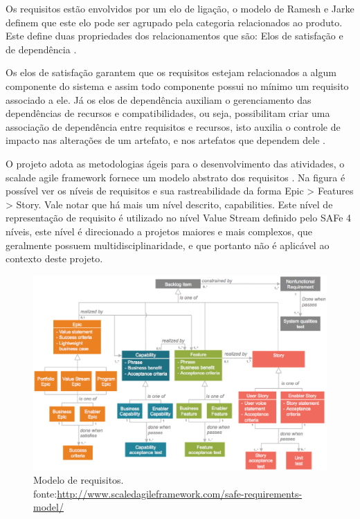 Os requisitos estão envolvidos por um elo de ligação, o modelo de Ramesh e Jarke definem que este elo pode ser agrupado pela categoria relacionados ao produto. Este define duas propriedades dos relacionamentos que são: Elos de satisfação e de dependência \cite{leite2005}.

Os elos de satisfação garantem que os requisitos estejam relacionados a algum componente do sistema e assim todo componente possui no mínimo um requisito associado a ele. Já os elos de dependência auxiliam o gerenciamento das dependências de recursos e compatibilidades, ou seja, possibilitam criar uma associação de dependência entre requisitos e recursos, isto auxilia o controle de impacto nas alterações de um artefato, e nos artefatos que dependem dele \cite{leite2005}.

O projeto adota as metodologias ágeis para o desenvolvimento das atividades, o scalade agile framework fornece um modelo abstrato dos requisitos \cite{safe}. Na figura é possível ver os níveis de requisitos e sua rastreabilidade da forma Epic > Features > Story. Vale notar que há mais um nível descrito, capabilities. Este nível de representação de requisito é utilizado no nível Value Stream definido pelo SAFe 4 níveis, este nível é direcionado a projetos maiores e mais complexos, que geralmente possuem multidisciplinaridade, e que portanto não é aplicável ao contexto deste projeto.

\begin{figure}[H]
    \centering
    \caption[Modelo de requisitos]{Modelo de requisitos. fonte:\url{http://www.scaledagileframework.com/safe-requirements-model/}}
    \label{modeloRequisitos}
    \includegraphics[keepaspectratio=true,scale=0.5]{figuras/modeloRequisitos.eps}
\end{figure}


